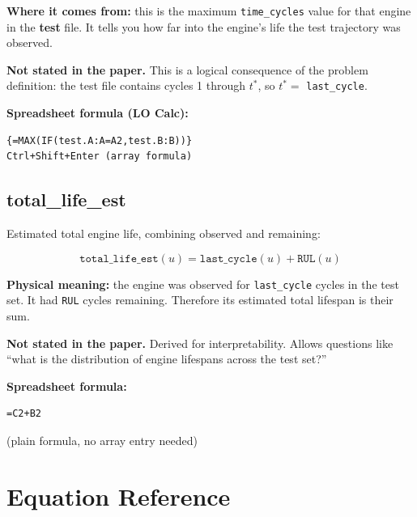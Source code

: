 \documentclass[11pt, a4paper]{article}
\begin{document}
\textbf{Where it comes from:} this is the maximum \texttt{time\_cycles}
value for that engine in the \textbf{test} file. It tells you how
far into the engine's life the test trajectory was observed.

\textbf{Not stated in the paper.} This is a logical consequence of
the problem definition: the test file contains cycles 1 through
$t^*$, so $t^* =$ \texttt{last\_cycle}.

\textbf{Spreadsheet formula (LO Calc):}
\begin{verbatim}
{=MAX(IF(test.A:A=A2,test.B:B))}
Ctrl+Shift+Enter (array formula)
\end{verbatim}

\subsection{total\_life\_est}

Estimated total engine life, combining observed and remaining:

\begin{equation}
  \texttt{total\_life\_est}(u) =
  \texttt{last\_cycle}(u) + \texttt{RUL}(u)
  \label{eq:totallife}
\end{equation}

\textbf{Physical meaning:} the engine was observed for
\texttt{last\_cycle} cycles in the test set. It had
\texttt{RUL} cycles remaining. Therefore its estimated
total lifespan is their sum.

\textbf{Not stated in the paper.} Derived for interpretability.
Allows questions like ``what is the distribution of engine lifespans
across the test set?''

\textbf{Spreadsheet formula:}
\begin{verbatim}
=C2+B2
\end{verbatim}
(plain formula, no array entry needed)

\section{Equation Reference}
\end{document}
